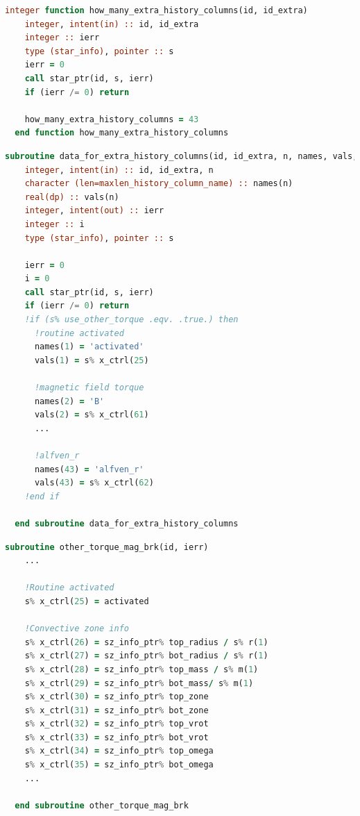 \begin{lstlisting}[language=Fortran, float, caption={Configuración del número de parámetros adicionales a incluir en el fichero de salida.}, label={lst:extra_columns}]
  integer function how_many_extra_history_columns(id, id_extra)
    integer, intent(in) :: id, id_extra
    integer :: ierr
    type (star_info), pointer :: s
    ierr = 0
    call star_ptr(id, s, ierr)
    if (ierr /= 0) return

    how_many_extra_history_columns = 43
  end function how_many_extra_history_columns
\end{lstlisting}

\begin{lstlisting}[language=Fortran, float, caption={Definición de los nombres de los campos adicionales a aparecer en el fichero de salida.}, label={lst:extra_name_columns}]
  subroutine data_for_extra_history_columns(id, id_extra, n, names, vals, ierr)
    integer, intent(in) :: id, id_extra, n
    character (len=maxlen_history_column_name) :: names(n)
    real(dp) :: vals(n)
    integer, intent(out) :: ierr
    integer :: i
    type (star_info), pointer :: s

    ierr = 0
    i = 0
    call star_ptr(id, s, ierr)
    if (ierr /= 0) return
    !if (s% use_other_torque .eqv. .true.) then
      !routine activated
      names(1) = 'activated'
      vals(1) = s% x_ctrl(25) 

      !magnetic field torque
      names(2) = 'B'
      vals(2) = s% x_ctrl(61)
      ...

      !alfven_r
      names(43) = 'alfven_r'
      vals(43) = s% x_ctrl(62)
    !end if

  end subroutine data_for_extra_history_columns

\end{lstlisting}

\begin{lstlisting}[language=Fortran, float, caption={Ejemplo de asignación de valores calculados para la zona convectiva a los parámetros extras definidos.}, label={lst:extra_name_columns}]
  subroutine other_torque_mag_brk(id, ierr)	
    ...
  
    !Routine activated
    s% x_ctrl(25) = activated

    !Convective zone info
    s% x_ctrl(26) = sz_info_ptr% top_radius / s% r(1)
    s% x_ctrl(27) = sz_info_ptr% bot_radius / s% r(1)
    s% x_ctrl(28) = sz_info_ptr% top_mass / s% m(1)
    s% x_ctrl(29) = sz_info_ptr% bot_mass/ s% m(1)
    s% x_ctrl(30) = sz_info_ptr% top_zone
    s% x_ctrl(31) = sz_info_ptr% bot_zone
    s% x_ctrl(32) = sz_info_ptr% top_vrot
    s% x_ctrl(33) = sz_info_ptr% bot_vrot
    s% x_ctrl(34) = sz_info_ptr% top_omega
    s% x_ctrl(35) = sz_info_ptr% bot_omega
    ...
  
  end subroutine other_torque_mag_brk
\end{lstlisting}


